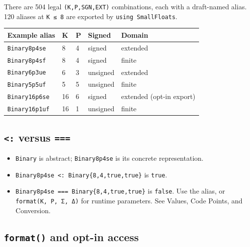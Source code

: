 There are 504 legal \texttt{(K,P,SGN,EXT)} combinations, each with a draft-named alias. 120 aliases at \texttt{K ≤ 8} are exported by \texttt{using SmallFloats}.




\begin{table}[h]
\centering
\begin{tabulary}{\linewidth}{L L L L L}
\toprule
Example alias & K & P & Signed & Domain \\
\toprule
\texttt{Binary8p4se} & 8 & 4 & signed & extended \\
\texttt{Binary8p4sf} & 8 & 4 & signed & finite \\
\texttt{Binary6p3ue} & 6 & 3 & unsigned & extended \\
\texttt{Binary5p5uf} & 5 & 5 & unsigned & finite \\
\texttt{Binary16p6se} & 16 & 6 & signed & extended (opt-in export) \\
\texttt{Binary16p1uf} & 16 & 1 & unsigned & finite \\
\bottomrule
\end{tabulary}

\end{table}



\subsection{\texttt{<:} versus \texttt{===}}



\label{7480538980344996601}{}


\begin{itemize}
\item \texttt{Binary} is abstract; \texttt{Binary8p4se} is its concrete representation.


\item \texttt{Binary8p4se <: Binary\{8,4,true,true\}} is \texttt{true}.


\item \texttt{Binary8p4se === Binary\{8,4,true,true\}} is \texttt{false}. Use the alias, or \texttt{format(K, P, Σ, Δ)} for runtime parameters. See Values, Code Points, and Conversion.

\end{itemize}


\subsection{\texttt{format()} and opt-in access}



